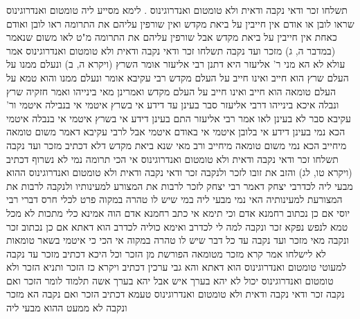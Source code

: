 \documentclass[12pt, openany]{book}
\begin{document}
{תשלחו זכר ודאי נקבה ודאית ולא טומטום ואנדרוגינוס .
לימא מסייע ליה  טומטום ואנדרוגינוס שראו לובן או אודם אין חייבין על ביאת מקדש ואין שורפין עליהם את התרומה  ראו לובן ואודם כאחת אין חייבין על ביאת מקדש אבל שורפין עליהם את התרומה 
מ"ט  לאו משום שנאמר (במדבר ה, ג) מזכר ועד נקבה תשלחו זכר ודאי נקבה ודאית ולא טומטום ואנדרוגינוס  אמר עולא  לא הא מני ר' אליעזר היא 
דתנן רבי אליעזר אומר  השרץ (ויקרא ה, ב) ונעלם ממנו על העלם שרץ הוא חייב ואינו חייב על העלם מקדש 
רבי עקיבא אומר  ונעלם ממנו והוא טמא על העלם טומאה הוא חייב ואינו חייב על העלם מקדש 
ואמרינן  מאי בינייהו  ואמר חזקיה  שרץ ונבלה איכא בינייהו דרבי אליעזר סבר בעינן עד דידע אי בשרץ איטמי אי בנבילה איטמי ור' עקיבא סבר לא בעינן 
לאו אמר רבי אליעזר התם בעינן דידע אי בשרץ איטמי אי בנבלה איטמי הכא נמי בעינן דידע אי בלובן איטמי אי באודם איטמי 
אבל לרבי עקיבא דאמר משום טומאה מיחייב הכא נמי משום טומאה מיחייב 
ורב מאי שנא ביאת מקדש דלא דכתיב מזכר ועד נקבה תשלחו זכר ודאי נקבה ודאית ולא טומטום ואנדרוגינוס 
אי הכי תרומה נמי לא נשרוף דכתיב (ויקרא טו, לג) והזב את זובו לזכר ולנקבה זכר ודאי נקבה ודאית ולא טומטום ואנדרוגינוס 
ההוא מבעי ליה לכדרבי יצחק דאמר רבי יצחק  לזכר לרבות את המצורע למעינותיו ולנקבה לרבות את המצורעת למעינותיה 
האי נמי מבעי ליה במי שיש לו טהרה במקוה פרט לכלי חרס דברי רבי יוסי 
אם כן נכתוב רחמנא אדם
וכי תימא אי כתב רחמנא אדם הוה אמינא כלי מתכות לא מכל טמא לנפש נפקא  זכר ונקבה למה לי לכדרב 
ואימא  כוליה לכדרב הוא דאתא  אם כן נכתוב זכר ונקבה מאי מזכר ועד נקבה עד כל דבר שיש לו טהרה במקוה 
אי הכי כי איטמי בשאר טומאות לא לישלחו  אמר קרא  מזכר מטומאה הפורשת מן הזכר 
וכל היכא דכתיב מזכר עד נקבה למעוטי טומטום ואנדרוגינוס הוא דאתא  והא גבי ערכין דכתיב {ויקרא כז } הזכר
ותניא  הזכר ולא טומטום ואנדרוגינוס יכול לא יהא בערך איש אבל יהא בערך אשה תלמוד לומר הזכר ואם נקבה זכר ודאי נקבה ודאית ולא טומטום ואנדרוגינוס 
טעמא דכתיב הזכר ואם נקבה הא מזכר ונקבה לא ממעט  ההוא מבעי ליה}
\end{document}
